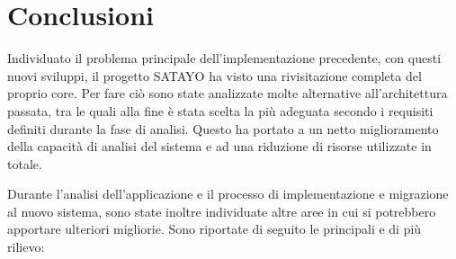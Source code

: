 \chapter{Conclusioni}
\label{cha:conclusioni}

Individuato il problema principale dell'implementazione precedente, con questi nuovi
sviluppi, il progetto SATAYO ha visto una rivisitazione completa del proprio
core. Per fare ciò sono state analizzate molte alternative all'architettura passata,
tra le quali alla fine è stata scelta la più adeguata secondo i requisiti
definiti durante la fase di analisi. Questo ha portato a un netto miglioramento della
capacità di analisi del sistema e ad una riduzione di risorse utilizzate in totale.

Durante l'analisi dell'applicazione e il processo di implementazione e migrazione
al nuovo sistema, sono state inoltre individuate altre aree in cui si potrebbero
apportare ulteriori migliorie. Sono riportate di seguito le principali e di più rilievo:

